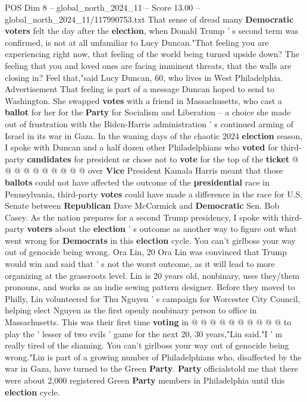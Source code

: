 \begin{textsample}{POS Dim 8 – global\_north\_2024\_11 – Score 13.00 – global\_north\_2024\_11/117990753.txt}  \label{ex:f8_pos_150}
That sense of dread many \textbf{Democratic} \textbf{voters} felt the day after the \textbf{election}, when Donald Trump ' s second term was confirmed, is not at all unfamiliar to Lucy Duncan."That feeling you are experiencing right now, that feeling of the world being turned upside down?
The feeling that you and loved ones are facing imminent threats, that the walls are closing in?
Feel that,"said Lucy Duncan, 60, who lives in West Philadelphia.
Advertisement That feeling is part of a message Duncan hoped to send to Washington.
She swapped \textbf{votes} with a friend in Massachusetts, who cast a \textbf{ballot} for her for the \textbf{Party} for Socialism and Liberation -- a choice she made out of frustration with the Biden-Harris administration ' s continued arming of Israel in its war in Gaza.
In the waning days of the chaotic 2024 \textbf{election} season, I spoke with Duncan and a half dozen other Philadelphians who \textbf{voted} for third-party \textbf{candidates} for president or chose not to \textbf{vote} for the top of the \textbf{ticket} @ @ @ @ @ @ @ @ @ @ over \textbf{Vice} President Kamala Harris meant that those \textbf{ballots} could not have affected the outcome of the \textbf{presidential} race in Pennsylvania, third-party \textbf{votes} could have made a difference in the race for U.S.
Senate between \textbf{Republican} Dave McCormick and \textbf{Democratic} Sen.
Bob Casey.
As the nation prepares for a second Trump presidency, I spoke with third-party \textbf{voters} about the \textbf{election} ' s outcome as another way to figure out what went wrong for \textbf{Democrats} in this \textbf{election} cycle.
You can't girlboss your way out of genocide being wrong.
Ora Lin, 20 Ora Lin was convinced that Trump would win and said that ' s not the worst outcome, as it will lead to more organizing at the grassroots level.
Lin is 20 years old, nonbinary, uses they/them pronouns, and works as an indie sewing pattern designer.
Before they moved to Philly, Lin volunteered for Thu Nguyen ' s campaign for Worcester City Council, helping elect Nguyen as the first openly nonbinary person to office in Massachusetts.
This was their first time \textbf{voting} in @ @ @ @ @ @ @ @ @ @ to play the ' lesser of two evils ' game for the next 20, 30 years,"Lin said."I ' m really tired of the shaming.
You can't girlboss your way out of genocide being wrong."Lin is part of a growing number of Philadelphians who, disaffected by the war in Gaza, have turned to the Green \textbf{Party}. \textbf{Party} officialstold me that there were about 2,000 registered Green \textbf{Party} members in Philadelphia until this \textbf{election} cycle.

\end{textsample}
